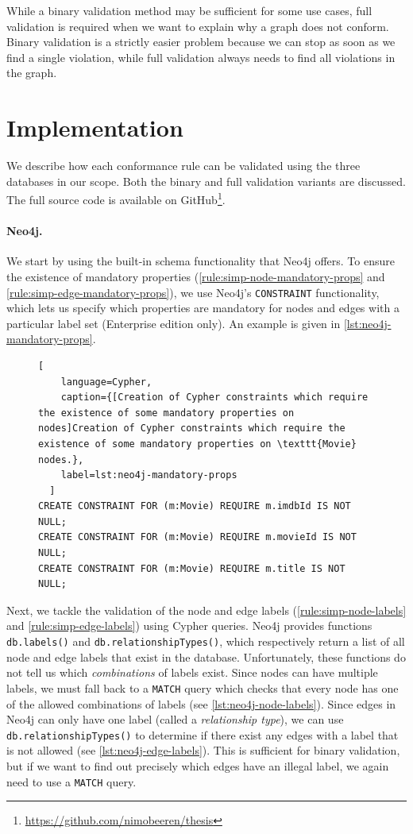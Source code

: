 \documentclass{report}
\theoremstyle{definition}
\begin{document}
While a binary validation method may be sufficient for some use cases, full validation is required when we want to explain why a graph does not conform. Binary validation is a strictly easier problem because we can stop as soon as we find a single violation, while full validation always needs to find all violations in the graph.

\section{Implementation}
\label{sec:implementation}

We describe how each conformance rule can be validated using the three databases in our scope. Both the binary and full validation variants are discussed. The full source code is available on GitHub\footnote{\url{https://github.com/nimobeeren/thesis}}.

\paragraph{Neo4j.} We start by using the built-in schema functionality that Neo4j offers. To ensure the existence of mandatory properties (\autoref{rule:simp-node-mandatory-props} and \ref{rule:simp-edge-mandatory-props}), we use Neo4j's \texttt{CONSTRAINT} functionality, which lets us specify which properties are mandatory for nodes and edges with a particular label set (Enterprise edition only). An example is given in \autoref{lst:neo4j-mandatory-props}.

\begin{figure}[H]
  \begin{lstlisting}[
    language=Cypher,
    caption={[Creation of Cypher constraints which require the existence of some mandatory properties on nodes]Creation of Cypher constraints which require the existence of some mandatory properties on \texttt{Movie} nodes.},
    label=lst:neo4j-mandatory-props
  ]
CREATE CONSTRAINT FOR (m:Movie) REQUIRE m.imdbId IS NOT NULL;
CREATE CONSTRAINT FOR (m:Movie) REQUIRE m.movieId IS NOT NULL;
CREATE CONSTRAINT FOR (m:Movie) REQUIRE m.title IS NOT NULL;
  \end{lstlisting}
\end{figure}

Next, we tackle the validation of the node and edge labels (\autoref{rule:simp-node-labels} and \ref{rule:simp-edge-labels}) using Cypher queries. Neo4j provides functions \texttt{db.labels()} and \texttt{db.relationshipTypes()}, which respectively return a list of all node and edge labels that exist in the database. Unfortunately, these functions do not tell us which \emph{combinations} of labels exist. Since nodes can have multiple labels, we must fall back to a \texttt{MATCH} query which checks that every node has one of the allowed combinations of labels (see \autoref{lst:neo4j-node-labels}). Since edges in Neo4j can only have one label (called a \emph{relationship type}), we can use \texttt{db.relationshipTypes()} to determine if there exist any edges with a label that is not allowed (see \autoref{lst:neo4j-edge-labels}). This is sufficient for binary validation, but if we want to find out precisely which edges have an illegal label, we again need to use a \texttt{MATCH} query.
\end{document}
